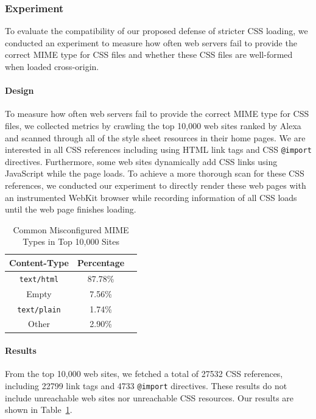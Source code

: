 \documentclass{acm_proc_article-sp}
\begin{document}
\subsubsection{Experiment}
To evaluate the compatibility of our proposed defense of stricter CSS loading, we conducted an experiment to measure how often web servers fail to provide the correct MIME type for CSS files and whether these CSS files are well-formed when loaded cross-origin.

\paragraph{Design}
To measure how often web servers fail to provide the correct MIME type for CSS files, we collected metrics by crawling the top 10,000 web sites ranked by Alexa~\cite{alexa} and scanned through all of the style sheet resources in their home pages. We are interested in all CSS references including using HTML link tags and CSS \texttt{@import} directives. Furthermore, some web sites dynamically add CSS links using JavaScript while the page loads. To achieve a more thorough scan for these CSS references, we conducted our experiment to directly render these web pages with an instrumented WebKit browser while recording information of all CSS loads until the web page finishes loading.

\begin{table}
\centering
\begin{tabular}{|c|c|c|} \hline
Content-Type&Percentage\\ \hline
\texttt{text/html}&87.78\%\\ \hline
Empty&7.56\%\\ \hline
\texttt{text/plain}&1.74\%\\ \hline
Other&2.90\%\\
\hline\end{tabular}
\caption{Common Misconfigured MIME Types in Top 10,000 Sites}
\label{table:MIME}
\end{table}

\paragraph{Results}
From the top 10,000 web sites, we fetched a total of 27532 CSS references, including 22799 link tags and 4733 \texttt{@import} directives. These results do not include unreachable web sites nor unreachable CSS resources.
Our results are shown in Table~\ref{table:MIME}.
\end{document}
